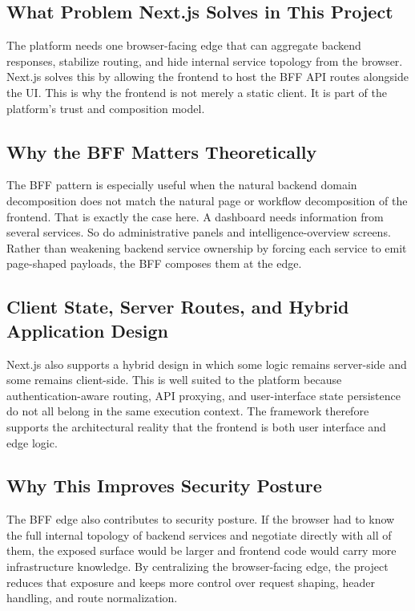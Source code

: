 \subsection{What Problem Next.js Solves in This Project}
The platform needs one browser-facing edge that can aggregate backend responses, stabilize routing, and hide internal service topology from the browser. Next.js solves this by allowing the frontend to host the BFF API routes alongside the UI. This is why the frontend is not merely a static client. It is part of the platform's trust and composition model.

\subsection{Why the BFF Matters Theoretically}
The BFF pattern is especially useful when the natural backend domain decomposition does not match the natural page or workflow decomposition of the frontend. That is exactly the case here. A dashboard needs information from several services. So do administrative panels and intelligence-overview screens. Rather than weakening backend service ownership by forcing each service to emit page-shaped payloads, the BFF composes them at the edge.

\subsection{Client State, Server Routes, and Hybrid Application Design}
Next.js also supports a hybrid design in which some logic remains server-side and some remains client-side. This is well suited to the platform because authentication-aware routing, API proxying, and user-interface state persistence do not all belong in the same execution context. The framework therefore supports the architectural reality that the frontend is both user interface and edge logic.

\subsection{Why This Improves Security Posture}
The BFF edge also contributes to security posture. If the browser had to know the full internal topology of backend services and negotiate directly with all of them, the exposed surface would be larger and frontend code would carry more infrastructure knowledge. By centralizing the browser-facing edge, the project reduces that exposure and keeps more control over request shaping, header handling, and route normalization.


